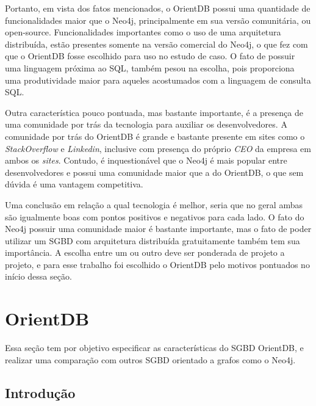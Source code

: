 	Portanto, em vista dos fatos mencionados, o OrientDB possui uma quantidade de funcionalidades maior que o Neo4j, principalmente em sua versão comunitária, ou open-source. Funcionalidades importantes como o uso de uma arquitetura distribuída, estão presentes somente na versão comercial do Neo4j, o que fez com que o OrientDB fosse escolhido para uso no estudo de caso. O fato de possuir uma linguagem próxima ao SQL, também pesou na escolha, pois proporciona uma produtividade maior para aqueles acostumados com a linguagem de consulta SQL.
	
	Outra característica pouco pontuada, mas bastante importante, é a presença de uma comunidade por trás da tecnologia para auxiliar os desenvolvedores. A comunidade por trás do OrientDB é grande e bastante presente em sites como o \textit{StackOverflow} \cite{orientStack} e \textit{Linkedin}, inclusive com presença do próprio \textit{CEO} da empresa em ambos os \textit{sites}. Contudo, é inquestionável que o Neo4j é mais popular entre desenvolvedores e possui uma comunidade maior que a do OrientDB, o que sem dúvida é uma vantagem competitiva.
	
	Uma conclusão em relação a qual tecnologia é melhor, seria que no geral ambas são igualmente boas com pontos positivos e negativos para cada lado. O fato do Neo4j possuir uma comunidade maior é bastante importante, mas o fato de poder utilizar um SGBD com arquitetura distribuída gratuitamente também tem sua importância. A escolha entre um ou outro deve ser ponderada de projeto a projeto, e para esse trabalho foi escolhido o OrientDB pelo motivos pontuados no início dessa seção.

\section{OrientDB} \label{OrientDBMain}

	Essa seção tem por objetivo especificar as características do SGBD OrientDB, e realizar uma comparação com outros SGBD orientado a grafos como o Neo4j.
	
\subsection{Introdução}
	
